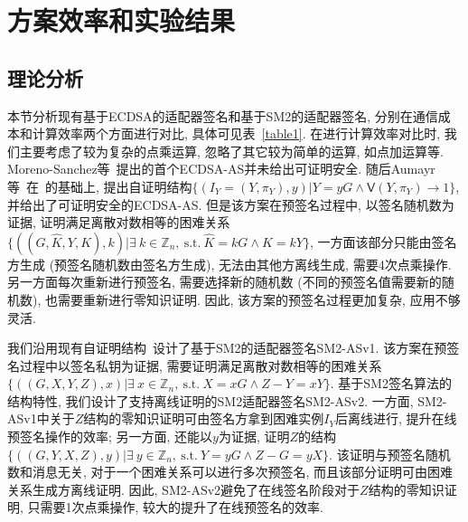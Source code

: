 \documentclass[review]{jcr}
\begin{document}
\section{方案效率和实验结果} 

\subsection{理论分析}

本节分析现有基于ECDSA的适配器签名和基于SM2的适配器签名, 分别在通信成本和计算效率两个方面进行对比, 具体可见表~\ref{table1}. 在进行计算效率对比时, 我们主要考虑了较为复杂的点乘运算, 忽略了其它较为简单的运算, 如点加运算等. Moreno{-}Sanchez等~\cite{PA18}提出的首个ECDSA-AS并未给出可证明安全. 随后Aumayr等~\cite{AumayrEEFHMMR20}在~\cite{PA18}的基础上, 提出自证明结构$\{(I_Y=(Y, \pi_Y), y) | Y = yG \wedge \mathsf{V}(Y, \pi_Y) \rightarrow 1\}$, 并给出了可证明安全的ECDSA-AS. 但是该方案在预签名过程中, 以签名随机数为证据, 证明满足离散对数相等的困难关系$\{((G,\hat{K},Y,K),k)|\exists\ k\in \mathbb{Z}_n,\ \text{s.t.}\ \hat{K}=kG\wedge K=kY\}$, 一方面该部分只能由签名方生成 (预签名随机数由签名方生成), 无法由其他方离线生成, 需要4次点乘操作.  另一方面每次重新进行预签名, 需要选择新的随机数 (不同的预签名值需要新的随机数), 也需要重新进行零知识证明. 因此, 该方案的预签名过程更加复杂, 应用不够灵活. 

我们沿用现有自证明结构~\cite{AumayrEEFHMMR20}设计了基于SM2的适配器签名SM2-ASv1. 该方案在预签名过程中以签名私钥为证据, 需要证明满足离散对数相等的困难关系$\{((G,X,Y,Z),x)|\exists\ x\in \mathbb{Z}_n,\ \text{s.t.}\ X=xG \wedge Z-Y=xY\}$. 基于SM2签名算法的结构特性, 我们设计了支持离线证明的SM2适配器签名SM2-ASv2. 一方面, SM2-ASv1中关于$Z$结构的零知识证明可由签名方拿到困难实例$I_Y$后离线进行, 提升在线预签名操作的效率; 另一方面, 还能以$y$为证据, 证明$Z$的结构$\{((G,Y,X,Z),y)|\exists\ y\in \mathbb{Z}_n,\ \text{s.t.}\ Y = yG \wedge Z-G = yX\}$. 该证明与预签名随机数和消息无关, 对于一个困难关系可以进行多次预签名, 而且该部分证明可由困难关系生成方离线证明. 因此, SM2-ASv2避免了在线签名阶段对于$Z$结构的零知识证明, 只需要1次点乘操作, 较大的提升了在线预签名的效率.
\end{document}

